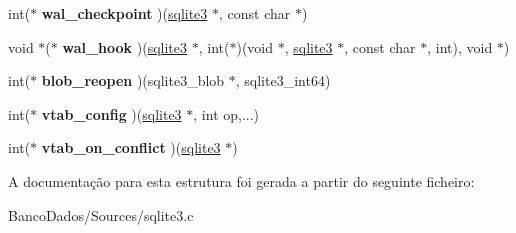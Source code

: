 \begin{DoxyCompactItemize}
\item 
\hypertarget{structsqlite3__api__routines_a8161479d3298a910a21e9d6dd92e1083}{int($\ast$ {\bfseries wal\-\_\-checkpoint} )(\hyperlink{structsqlite3}{sqlite3} $\ast$, const char $\ast$)}\label{structsqlite3__api__routines_a8161479d3298a910a21e9d6dd92e1083}

\item 
\hypertarget{structsqlite3__api__routines_ad2420d28d695f23941f69e53777819a9}{void $\ast$($\ast$ {\bfseries wal\-\_\-hook} )(\hyperlink{structsqlite3}{sqlite3} $\ast$, int($\ast$)(void $\ast$, \hyperlink{structsqlite3}{sqlite3} $\ast$, const char $\ast$, int), void $\ast$)}\label{structsqlite3__api__routines_ad2420d28d695f23941f69e53777819a9}

\item 
\hypertarget{structsqlite3__api__routines_aa908e25dd18c6a891a767eec620484e5}{int($\ast$ {\bfseries blob\-\_\-reopen} )(sqlite3\-\_\-blob $\ast$, sqlite3\-\_\-int64)}\label{structsqlite3__api__routines_aa908e25dd18c6a891a767eec620484e5}

\item 
\hypertarget{structsqlite3__api__routines_a9670fe7124c3bd00b32354933c15313f}{int($\ast$ {\bfseries vtab\-\_\-config} )(\hyperlink{structsqlite3}{sqlite3} $\ast$, int op,...)}\label{structsqlite3__api__routines_a9670fe7124c3bd00b32354933c15313f}

\item 
\hypertarget{structsqlite3__api__routines_ae153b85e12e894c0bfb433c13c2690d7}{int($\ast$ {\bfseries vtab\-\_\-on\-\_\-conflict} )(\hyperlink{structsqlite3}{sqlite3} $\ast$)}\label{structsqlite3__api__routines_ae153b85e12e894c0bfb433c13c2690d7}

\end{DoxyCompactItemize}


A documentação para esta estrutura foi gerada a partir do seguinte ficheiro\-:\begin{DoxyCompactItemize}
\item 
Banco\-Dados/\-Sources/sqlite3.\-c\end{DoxyCompactItemize}
